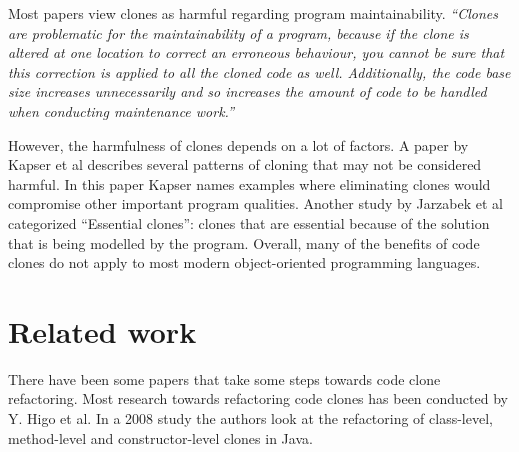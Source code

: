 Most papers view clones as harmful regarding program maintainability. \textit{``Clones are problematic for the maintainability of a program, because if the clone is altered at one location to correct an erroneous behaviour, you cannot be sure that this correction is applied to all the cloned code as well. Additionally, the code base size increases unnecessarily and so increases the amount of code to be handled when conducting maintenance work.''} \cite{ostberg2014automatically}

However, the harmfulness of clones depends on a lot of factors. A paper by Kapser et al \cite{kapser2006cloning} describes several patterns of cloning that may not be considered harmful. In this paper Kapser names examples where eliminating clones would compromise other important program qualities. Another study by Jarzabek et al \cite{jarzabek2010clones} categorized ``Essential clones'': clones that are essential because of the solution that is being modelled by the program. Overall, many of the benefits of code clones do not apply to most modern object-oriented programming languages.

\section{Related work}
There have been some papers that take some steps towards code clone refactoring. Most research towards refactoring code clones has been conducted by Y. Higo et al. In a 2008 study \cite{higo2008metric} the authors look at the refactoring of class-level, method-level and constructor-level clones in Java.
